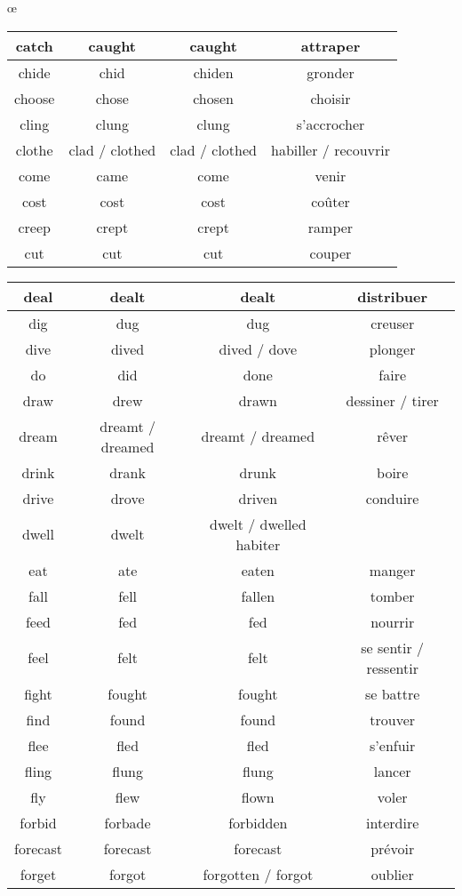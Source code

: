 œ\documentclass[a4paper,12pt,openany]{book}
\begin{document}
\begin{tabular}{|c|c|c|c|}
\hline
catch & caught & caught & attraper\\
\hline
chide & chid & chiden & gronder\\
\hline
choose & chose & chosen & choisir\\
\hline
cling & clung & clung & s’accrocher\\
\hline
clothe & clad / clothed & clad / clothed & habiller / recouvrir\\
\hline
come & came & come & venir\\
\hline
cost & cost & cost & coûter\\
\hline
creep & crept & crept & ramper\\
\hline
cut & cut & cut & couper\\
\hline
\end{tabular}
\newpage
\begin{tabular}{|c|c|c|c|}
\hline
deal & dealt & dealt & distribuer\\
\hline
dig	 & dug	 & dug & creuser\\
\hline
dive & dived & dived / dove & plonger\\
\hline
do & did & done & faire\\
\hline
draw & drew & drawn & dessiner / tirer\\
\hline
dream & dreamt / dreamed & dreamt / dreamed & rêver\\
\hline
drink & drank & drunk & boire\\
\hline
drive  & drove & driven & conduire\\
\hline
dwell & dwelt & dwelt / dwelled	habiter\\
\hline
eat & ate & eaten & manger\\
\hline
fall & fell & fallen & tomber\\
\hline
feed & fed & fed & nourrir\\
\hline
feel & felt & felt & se sentir / ressentir\\
\hline
fight & fought & fought & se battre\\
\hline
find & found & found & trouver\\
\hline
flee & fled & fled & s’enfuir\\
\hline
fling & flung & flung & lancer\\
\hline
fly & flew & flown & voler\\
\hline
forbid & forbade & forbidden & interdire\\
\hline
forecast & forecast & forecast & prévoir\\
\hline
forget & forgot & forgotten / forgot & oublier\\

\end{tabular}
\end{document}

